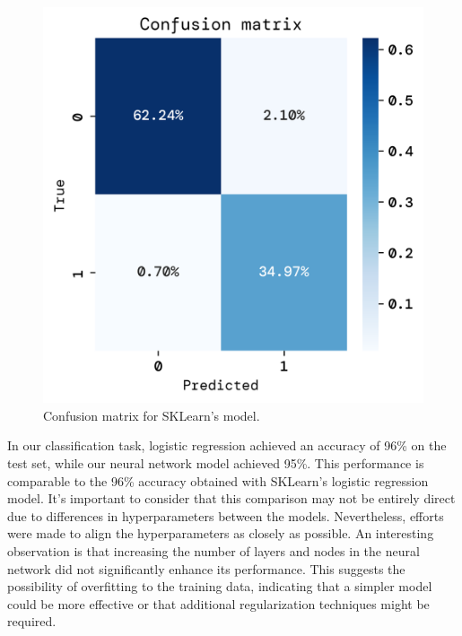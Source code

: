 \documentclass[twoside,11pt]{report}
\begin{document}
\begin{figure}[!ht]
\begin{minipage}[t]{0.5\textwidth - 1mm}
\begin{center}
                \includegraphics[width=\textwidth]{../runsAndFigures/confusion_matrix_sklearn.png}
            \end{center}
            \caption
            {
                Confusion matrix for SKLearn's model.
            }\label{fig:confusion_matrix_sklearn}
        \end{minipage}
    \end{figure}

    \noindent
    In our classification task, logistic regression achieved an accuracy of 96\% on the test set, 
    while our neural network model achieved 95\%. This performance is comparable to the 96\% accuracy 
    obtained with SKLearn's logistic regression model. It's important to consider that this comparison may not be 
    entirely direct due to differences in hyperparameters between the models. Nevertheless, efforts were made to 
    align the hyperparameters as closely as possible.
    An interesting observation is that increasing the number of layers and nodes in the neural network 
    did not significantly enhance its performance. This suggests the possibility of overfitting to the 
    training data, indicating that a simpler model could be more effective or that additional regularization 
    techniques might be required.
    
\end{document}
